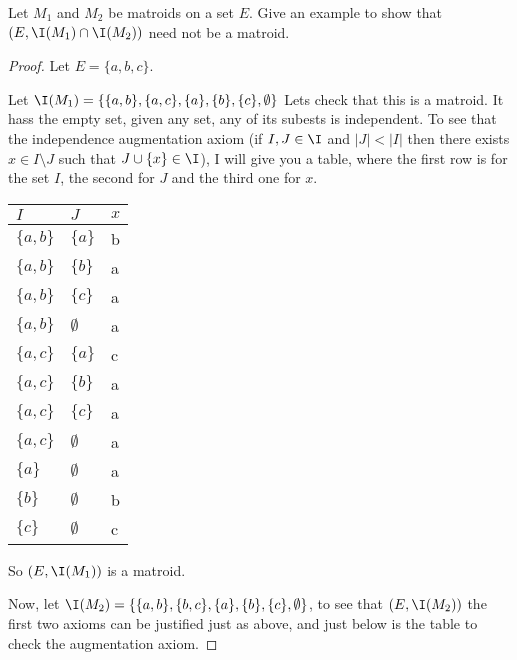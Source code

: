 \prob
{
    Let $M_1$ and $M_2$ be matroids on a set $E$. Give an example to show that
    $(E, \I(M_1) \cap \I(M_2))$ need not be a matroid.
}

\begin{proof}
    Let $E = \{a, b, c\}$.
    
    Let $\I(M_1) = \{ \{a, b\}, \{a, c\}, \{a\}, \{b\}, \{c\}, \emptyset \}$
    Lets check that this is a matroid. It hass the empty set, given any set, any of its subests is independent.
    To see that the independence augmentation axiom (if $I, J \in \I$ and $|J| < |I|$ then there exists
    $x \in I \setminus J$ such that $J \cup \{x\}  \in \I$), I will give you a table, where the first row is for the
    set $I$, the second for $J$ and the third one for $x$.\pn
    
    \begin{center}
        \begin{tabular}{ | p{1cm} | p{1cm} | p{1cm} |}
            \hline $I$          & $J$           &   $x$ \\ \hline
            \hline $\{a, b\}$   & $\{a\}$       &  b    \\
            \hline $\{a, b\}$   & $\{b\}$       &  a    \\
            \hline $\{a, b\}$   & $\{c\}$       &  a    \\
            \hline $\{a, b\}$   & $\emptyset$   &  a    \\
            \hline $\{a, c\}$   & $\{a\}$       &  c    \\
            \hline $\{a, c\}$   & $\{b\}$       &  a    \\
            \hline $\{a, c\}$   & $\{c\}$       &  a    \\
            \hline $\{a, c\}$   & $\emptyset$   &  a    \\
            \hline $\{a\}$      & $\emptyset$   &  a    \\
            \hline $\{b\}$      & $\emptyset$   &  b    \\
            \hline $\{c\}$      & $\emptyset$   &  c    \\ \hline
        \end{tabular}    
    \end{center}
    
    So $(E, \I(M_1))$ is a matroid.\pn
        
    Now, let $\I(M_2) = \{ \{a, b\}, \{b, c\}, \{a\}, \{b\}, \{c\}, \emptyset \}$, to see that $(E, \I(M_2))$ 
    the first two axioms can be justified just as above, and just below is the table to check the augmentation axiom.\pn
    

\end{proof}
